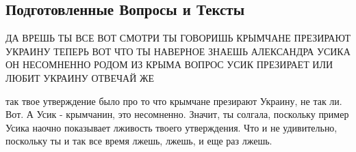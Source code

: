  
 
 
 
 

\subsection{Подготовленные Вопросы и Тексты}





ДА ВРЕШЬ ТЫ ВСЕ ВОТ СМОТРИ ТЫ ГОВОРИШЬ КРЫМЧАНЕ ПРЕЗИРАЮТ УКРАИНУ ТЕПЕРЬ ВОТ
ЧТО ТЫ НАВЕРНОЕ ЗНАЕШЬ АЛЕКСАНДРА УСИКА ОН НЕСОМНЕННО РОДОМ ИЗ КРЫМА ВОПРОС
УСИК ПРЕЗИРАЕТ ИЛИ ЛЮБИТ УКРАИНУ ОТВЕЧАЙ ЖЕ

так твое утверждение было про то что крымчане презирают Украину, не так ли.
Вот. А Усик - крымчанин, это несомненно. Значит, ты солгала, поскольку пример
Усика наочно показывает лживость твоего утверждения. Что и не удивительно,
поскольку ты и так все время лжешь, лжешь, и еще раз лжешь.

